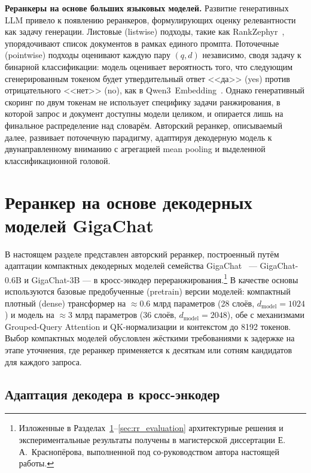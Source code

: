 \textbf{Реранкеры на основе больших языковых моделей.} Развитие генеративных LLM привело к появлению реранкеров, формулирующих оценку релевантности как задачу генерации.
Листовые (listwise) подходы, такие как RankZephyr~\cite{2312.02724}, упорядочивают список документов в рамках единого промпта.
Поточечные (pointwise) подходы оценивают каждую пару $(q, d)$ независимо, сводя задачу к бинарной классификации: модель оценивает вероятность того, что следующим сгенерированным токеном будет утвердительный ответ <<да>> (yes) против отрицательного <<нет>> (no), как в Qwen3~Embedding~\cite{2506.05176}.
Однако генеративный скоринг по двум токенам не использует специфику задачи ранжирования, в которой запрос и документ доступны модели целиком, и опирается лишь на финальное распределение над словарём.
Авторский реранкер, описываемый далее, развивает поточечную парадигму, адаптируя декодерную модель к двунаправленному вниманию с агрегацией mean pooling и выделенной классификационной головой.

\section{Реранкер на основе декодерных моделей GigaChat}\label{sec:rr_gigachat}

В настоящем разделе представлен авторский реранкер, построенный путём адаптации компактных декодерных моделей семейства GigaChat~\cite{2506.09440} --- GigaChat-0.6B и GigaChat-3B --- в кросс-энкодер переранжирования.\footnote{Изложенные в Разделах~\ref{sec:rr_gigachat}--\ref{sec:rr_evaluation} архитектурные решения и экспериментальные результаты получены в магистерской диссертации Е.\,А.~Краснопёрова, выполненной под со-руководством автора настоящей работы.}
В качестве основы используются базовые предобученные (pretrain) версии моделей: компактный плотный (dense) трансформер на $\approx$0.6 млрд параметров (28 слоёв, $d_{\text{model}} = 1024$) и модель на $\approx$3 млрд параметров (36 слоёв, $d_{\text{model}} = 2048$), обе с механизмами Grouped-Query Attention и QK-нормализации и контекстом до 8192 токенов.
Выбор компактных моделей обусловлен жёсткими требованиями к задержке на этапе уточнения, где реранкер применяется к десяткам или сотням кандидатов для каждого запроса.

\subsection{Адаптация декодера в кросс-энкодер}\label{subsec:rr_formulation}

